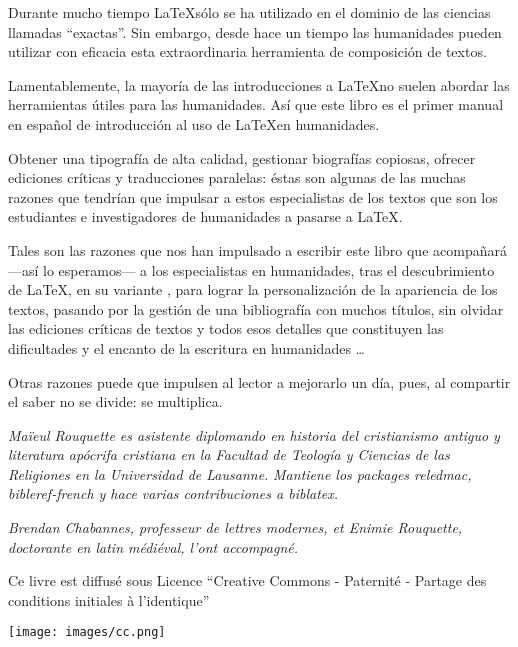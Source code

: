 \thispagestyle{empty}

Durante mucho tiempo \LaTeX sólo se ha utilizado en el dominio de las ciencias llamadas \enquote{exactas}. Sin embargo, desde hace un tiempo las humanidades pueden utilizar con eficacia esta extraordinaria herramienta de composición de textos.


Lamentablemente, la mayoría de las introducciones a \LaTeX no suelen abordar las herramientas útiles para las humanidades. Así que este libro es el primer manual en español de introducción al uso de \LaTeX en humanidades.

Obtener una tipografía de alta calidad, gestionar biografías copiosas, ofrecer ediciones críticas y traducciones paralelas: éstas son algunas de las muchas razones que  tendrían que impulsar a estos especialistas de los textos que son los estudiantes e investigadores de humanidades a pasarse a \LaTeX.

Tales son las razones que nos han impulsado a escribir este libro que acompañará ---así lo esperamos--- a los especialistas en humanidades, tras el descubrimiento de \LaTeX, en su variante  \XeLaTeX,  para lograr la personalización de la apariencia de los textos, pasando por la gestión de una bibliografía con muchos títulos, sin olvidar las ediciones críticas de textos y todos esos detalles que constituyen las dificultades y el encanto de la escritura en humanidades \ldots

Otras razones puede que impulsen al lector a mejorarlo un día, pues, al compartir el saber no se divide: se multiplica.

\vspace{4ex}

\scriptsize
\emph{
Maïeul Rouquette es asistente diplomando en historia del cristianismo antiguo y literatura apócrifa cristiana en la Facultad de Teología y Ciencias de las Religiones en la Universidad de Lausanne.} 
\emph{Mantiene los packages \emph{reledmac}, \emph{bibleref-french} y hace varias contribuciones a \emph{biblatex}.}


\emph{Brendan Chabannes, professeur de lettres modernes, et Enimie Rouquette, doctorante en latin médiéval, l'ont accompagné.}

\normalsize

\vspace{4ex}
Ce livre est diffusé sous Licence \enquote{Creative Commons - Paternité - Partage des conditions initiales à l'identique}

\vspace{2ex}
 \raggedleft\texttt{[image: images/cc.png]}
